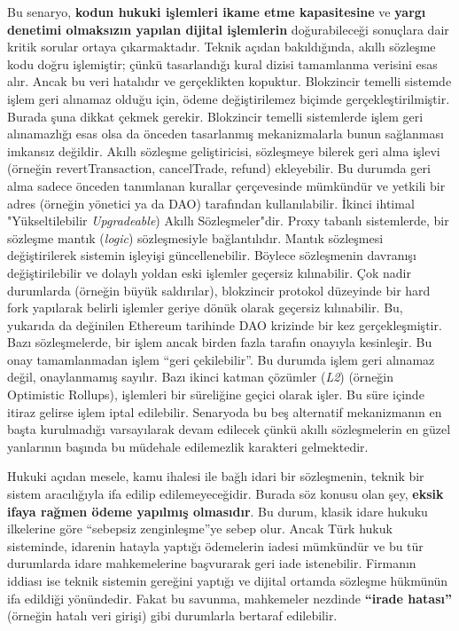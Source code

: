 \documentclass[a4paper,12pt]{article}
\begin{document}
Bu senaryo, \textbf{kodun hukuki işlemleri ikame etme kapasitesine} ve \textbf{yargı denetimi olmaksızın yapılan dijital işlemlerin} doğurabileceği sonuçlara dair kritik sorular ortaya çıkarmaktadır. Teknik açıdan bakıldığında, akıllı sözleşme kodu doğru işlemiştir; çünkü tasarlandığı kural dizisi tamamlanma verisini esas alır. Ancak bu veri hatalıdır ve gerçeklikten kopuktur. Blokzincir temelli sistemde işlem geri alınamaz olduğu için, ödeme değiştirilemez biçimde gerçekleştirilmiştir. Burada şuna dikkat çekmek gerekir. Blokzincir temelli sistemlerde işlem geri alınamazlığı esas olsa da önceden tasarlanmış mekanizmalarla bunun sağlanması imkansız değildir. Akıllı sözleşme geliştiricisi, sözleşmeye bilerek geri alma işlevi (örneğin revertTransaction, cancelTrade, refund) ekleyebilir. Bu durumda geri alma sadece önceden tanımlanan kurallar çerçevesinde mümkündür ve yetkili bir adres (örneğin yönetici ya da DAO) tarafından kullanılabilir. İkinci ihtimal "Yükseltilebilir \textit{Upgradeable}) Akıllı Sözleşmeler"dir. Proxy tabanlı sistemlerde, bir sözleşme mantık (\textit{logic}) sözleşmesiyle bağlantılıdır. Mantık sözleşmesi değiştirilerek sistemin işleyişi güncellenebilir. Böylece sözleşmenin davranışı değiştirilebilir ve dolaylı yoldan eski işlemler geçersiz kılınabilir. Çok nadir durumlarda (örneğin büyük saldırılar), blokzincir protokol düzeyinde bir hard fork yapılarak belirli işlemler geriye dönük olarak geçersiz kılınabilir. Bu, yukarıda da değinilen Ethereum tarihinde DAO krizinde bir kez gerçekleşmiştir. Bazı sözleşmelerde, bir işlem ancak birden fazla tarafın onayıyla kesinleşir. Bu onay tamamlanmadan işlem “geri çekilebilir”. Bu durumda işlem geri alınamaz değil, onaylanmamış sayılır. Bazı ikinci katman çözümler (\textit{L2}) (örneğin Optimistic Rollups), işlemleri bir süreliğine geçici olarak işler. Bu süre içinde itiraz gelirse işlem iptal edilebilir. Senaryoda bu beş alternatif mekanizmanın en başta kurulmadığı varsayılarak devam edilecek çünkü akıllı sözleşmelerin en güzel yanlarının başında bu müdehale edilemezlik karakteri gelmektedir. 

Hukuki açıdan mesele, kamu ihalesi ile bağlı idari bir sözleşmenin, teknik bir sistem aracılığıyla ifa edilip edilemeyeceğidir. Burada söz konusu olan şey, \textbf{eksik ifaya rağmen ödeme yapılmış olmasıdır}. Bu durum, klasik idare hukuku ilkelerine göre “sebepsiz zenginleşme”ye sebep olur. Ancak Türk hukuk sisteminde, idarenin hatayla yaptığı ödemelerin iadesi mümkündür ve bu tür durumlarda idare mahkemelerine başvurarak geri iade istenebilir. Firmanın iddiası ise teknik sistemin gereğini yaptığı ve dijital ortamda sözleşme hükmünün ifa edildiği yönündedir. Fakat bu savunma, mahkemeler nezdinde \textbf{“irade hatası”} (örneğin hatalı veri girişi) gibi durumlarla bertaraf edilebilir.
\end{document}
